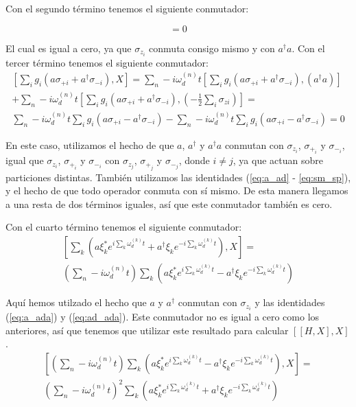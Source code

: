 Con el segundo término tenemos el siguiente conmutador:

\begin{equation}
    [- \frac{1}{2} \sum\limits_i \omega_{qi} \sigma_{zi} , X] = 0
\end{equation}

El cual es igual a cero, ya que $\sigma_{z_i}$ conmuta consigo mismo y con $a^\dagger a$. Con el tercer término tenemos el siguiente conmutador:
\begin{multline}
\left[\sum\limits_i g_i (a \sigma_{+ i} + a^\dagger \sigma_{- i}), X\right] = 
\sum\limits_n-i \omega_d^{(n)} t \left[\sum\limits_i g_i (a \sigma_{+ i} + a^\dagger \sigma_{- i}), (a^\dagger a)\right] \\
+ \sum\limits_n-i \omega_d^{(n)} t \left[\sum\limits_i g_i (a \sigma_{+ i} + a^\dagger \sigma_{- i}), (- \frac{1}{2} \sum\limits_i \sigma_{z i})\right] = \\
\sum\limits_n-i \omega_d^{(n)} t \sum\limits_i g_i (a \sigma_{+ i} - a^\dagger \sigma_{- i})
- \sum\limits_n-i \omega_d^{(n)} t \sum\limits_i g_i (a \sigma_{+ i} - a^\dagger \sigma_{- i}) = 0
\end{multline}

En este caso, utilizamos el hecho de que $a$, $a^\dagger$ y $a^\dagger a$ conmutan con $\sigma_{z_i}$, $\sigma_{+_i}$ y $\sigma_{-_i}$, igual que $\sigma_{z_i}$, $\sigma_{+_i}$ y $\sigma_{-_i}$ con $\sigma_{z_j}$, $\sigma_{+_j}$ y $\sigma_{-_j}$, donde $i \neq j$, ya que actuan sobre particiones distintas. También utilizamos las identidades (\ref{eq:a_ad} - \ref{eq:sm_sp}), y el hecho de que todo operador conmuta con sí mismo. De esta manera llegamos a una resta de dos términos iguales, así que este conmutador también es cero.

Con el cuarto término tenemos el siguiente conmutador:
\begin{multline}
    \left[\sum\limits_k \left(a\xi_k^*e^{i\sum\limits_k \omega_d^{(k)}t}+ a^\dagger\xi_ke^{-i\sum\limits_k \omega_d^{(k)}t}\right), X\right] = \\
    \left(\sum\limits_n-i \omega_d^{(n)} t\right) \sum\limits_k \left(a\xi_k^*e^{i\sum\limits_k \omega_d^{(k)}t} - a^\dagger\xi_ke^{-i\sum\limits_k \omega_d^{(k)}t}\right)
\end{multline}

Aquí hemos utilzado el hecho que $a$ y $a^\dagger$ conmutan con $\sigma_{z_i}$ y las identidades (\ref{eq:a_ada}) y (\ref{eq:ad_ada}). Este conmutador no es igual a cero como los anteriores, así que tenemos que utilizar este resultado para calcular $[[H,X],X]$.
\begin{multline}
    \left[\left(\sum\limits_n-i \omega_d^{(n)} t\right) \sum\limits_k \left(a\xi_k^*e^{i\sum\limits_k \omega_d^{(k)}t} - a^\dagger\xi_ke^{-i\sum\limits_k \omega_d^{(k)}t}\right), X\right] = \\
    \left(\sum\limits_n-i \omega_d^{(n)} t\right)^2 \sum\limits_k \left(a\xi_k^*e^{i\sum\limits_k \omega_d^{(k)}t} + a^\dagger\xi_ke^{-i\sum\limits_k \omega_d^{(k)}t}\right)
\end{multline}
 
